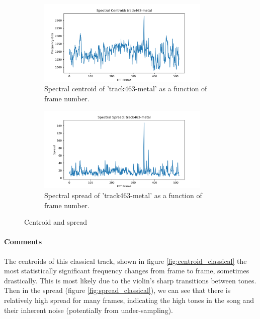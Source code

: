 \documentclass[11pt,a4paper]{article}
\begin{document}
\begin{figure}[tb]\ContinuedFloat
	\begin{subfigure}[t]{\hsize}
		\centering
		\includegraphics[width=0.9\textwidth]{centroid_track463-metal}
		\caption{Spectral centroid of 'track463-metal' as a function of frame number.}
		\label{fig:centroid_metal}
	\end{subfigure}
	\begin{subfigure}[t]{\hsize}
		\centering
		\includegraphics[width=0.9\textwidth]{spread_track463-metal}
		\caption{Spectral spread of 'track463-metal' as a function of frame number.}
		\label{fig:spread_metal}
	\end{subfigure}
	\caption{Centroid and spread}
\end{figure}
\clearpage

\paragraph{Comments} The centroids of this classical track, shown in figure \ref{fig:centroid_classical} the most statistically significant frequency changes from frame to frame, sometimes drastically. This is most likely due to the violin's sharp transitions between tones. Then in the spread (figure \ref{fig:spread_classical}), we can see that there is relatively high spread for many frames, indicating the high tones in the song and their inherent noise (potentially from under-sampling).
\end{document}
